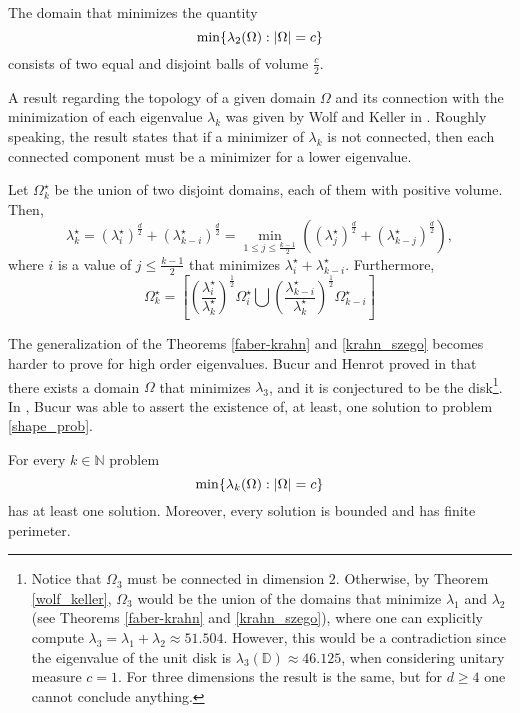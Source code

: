 \begin{theorem}\label{krahn_szego}
    The domain that minimizes the quantity
    \[
    \min\{\lambda_2(\Omega): \abs{\Omega} = c\}
    \]
    consists of two equal and disjoint balls of volume \(\frac{c}{2}\).
\end{theorem}

A result regarding the topology of a given domain \(\Omega\) and its connection with the minimization of each eigenvalue \(\lambda_k\) was given by Wolf and Keller in \cite{wolf1994range}. Roughly speaking, the result states that if a minimizer of \(\lambda_k\) is not connected, then each connected component must be a minimizer for a lower eigenvalue.
\begin{theorem}\label{wolf_keller}
    Let \(\Omega_k^\star\) be the union of two disjoint domains, each of them with positive volume. Then,
    \[
        \lambda_k^\star = (\lambda_i^\star)^\frac{d}{2} + (\lambda_{k-i}^\star)^\frac{d}{2} = \min_{1 \leq j \leq \frac{k-1}{2}}((\lambda_j^\star)^\frac{d}{2} + (\lambda_{k-j}^\star)^\frac{d}{2}),
    \]
    where \(i\) is a value of \(j \leq \frac{k-1}{2}\) that minimizes \(\lambda_i^\star + \lambda_{k-i}^\star\). Furthermore,
    \[
        \Omega_k^\star = \left[\left(\frac{\lambda_i^\star}{\lambda_k^\star}\right)^\frac{1}{2} \Omega_i^\star \bigcup \left(\frac{\lambda_{k-i}^\star}{\lambda_k^\star}\right)^\frac{1}{2} \Omega_{k-i}^\star \right]
    \]
\end{theorem}

The generalization of the Theorems \eqref{faber-krahn} and \eqref{krahn_szego} becomes harder to prove for high order eigenvalues. Bucur and Henrot proved in \cite{henrot2000minimization} that there exists a domain \(\Omega\) that minimizes \(\lambda_3\), and it is conjectured to be the disk\footnote{Notice that \(\Omega_3\) must be connected in dimension \(2\). Otherwise, by Theorem \eqref{wolf_keller}, \(\Omega_3\) would be the union of the domains that minimize \(\lambda_1\) and \(\lambda_2\) (see Theorems \eqref{faber-krahn} and \eqref{krahn_szego}), where one can explicitly compute \(\lambda_3 = \lambda_1 + \lambda_2 \approx 51.504\). However, this would be a contradiction since the eigenvalue of the unit disk is \(\lambda_3(\mathbb{D}) \approx 46.125\), when considering unitary measure \(c=1\). For three dimensions the result is the same, but for \(d \geq 4\) one cannot conclude anything.}.
In \cite{bucur2012minimization}, Bucur was able to assert the existence of, at least, one solution to problem \eqref{shape_prob}.
\begin{theorem}[Bucur]
    For every \(k \in \mathbb{N}\) problem
    \[
    \min\{\lambda_k(\Omega): \abs{\Omega} = c\}
    \]
    has at least one solution. Moreover, every solution is bounded and has finite perimeter.
\end{theorem}


